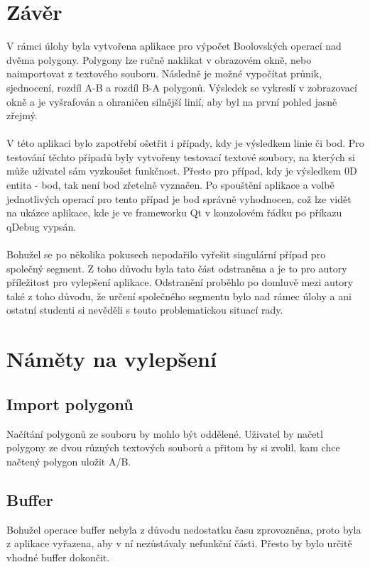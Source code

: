 \documentclass[a4paper, 12pt]{article}
\begin{document}
\clearpage
\section{Závěr}
V rámci úlohy byla vytvořena aplikace pro výpočet Boolovských operací nad dvěma polygony. Polygony lze ručně naklikat v obrazovém okně, nebo naimportovat z textového souboru. Následně je možné vypočítat průnik, sjednocení, rozdíl A-B a rozdíl B-A polygonů. Výsledek se vykreslí v zobrazovací okně a je vyšrafován a ohraničen silnější linií, aby byl na první pohled jasně zřejmý.\\
\\
V této aplikaci bylo zapotřebí ošetřit i případy, kdy je výsledkem linie či bod. Pro testování těchto případů byly vytvořeny testovací textové soubory, na kterých si může uživatel sám vyzkoušet funkčnost. Přesto pro případ, kdy je výsledkem 0D entita - bod, tak není bod zřetelně vyznačen. Po spouštění aplikace a volbě jednotlivých operací pro tento případ je bod správně vyhodnocen, což lze vidět na ukázce aplikace, kde je ve frameworku Qt v konzolovém řádku po příkazu qDebug vypsán. \\
\\
Bohužel se po několika pokusech nepodařilo vyřešit singulární případ pro společný segment. Z toho důvodu byla tato část odstraněna a je to pro autory příležitost pro vylepšení aplikace. Odstranění proběhlo po domluvě mezi autory také z toho důvodu, že určení společného segmentu bylo nad rámec úlohy a ani ostatní studenti si nevěděli s touto problematickou situací rady.


\section{Náměty na vylepšení}
\subsection{Import polygonů}
Načítání polygonů ze souboru by mohlo být oddělené. Uživatel by načetl polygony ze dvou různých textových souborů a přitom by si zvolil, kam chce načtený polygon uložit A/B.

\subsection{Buffer}
Bohužel operace buffer nebyla z důvodu nedostatku času zprovozněna, proto byla z aplikace vyřazena, aby v ní nezůstávaly nefunkční části. Přesto by bylo určitě vhodné buffer dokončit. 
\end{document}
